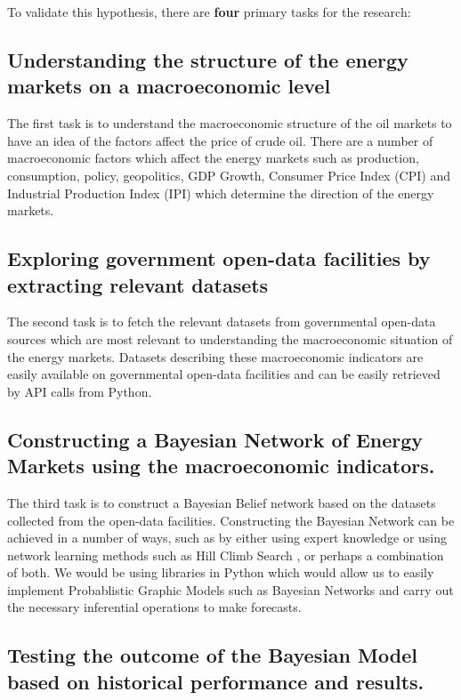 To validate this hypothesis, there are \textbf{four} primary tasks for the research:

\subsection{Understanding the structure of the energy markets on a macroeconomic level}

The first task is to understand the macroeconomic structure of the oil markets to have an idea of the factors affect the price of crude oil. There are a number of macroeconomic factors \cite{Lee2017} which affect the energy markets such as production, consumption, policy, geopolitics, GDP Growth, Consumer Price Index (CPI) and Industrial Production Index (IPI) which determine the direction of the energy markets.

\subsection{Exploring government open-data facilities by extracting relevant datasets}

The second task is to fetch the relevant datasets from governmental open-data sources which are most relevant to understanding the macroeconomic situation of the energy markets. Datasets describing these macroeconomic indicators are easily available on governmental open-data facilities and can be easily retrieved by API calls from Python.

\subsection{Constructing a Bayesian Network of Energy Markets using the macroeconomic indicators.}

The third task is to construct a Bayesian Belief network based on the datasets collected from the open-data facilities. Constructing the Bayesian Network can be achieved in a number of ways, such as by either using expert knowledge or using network learning methods such as Hill Climb Search \cite{neapolitan2004learning}, or perhaps a combination of both. We would be using libraries in Python which would allow us to easily implement Probablistic Graphic Models such as Bayesian Networks and carry out the necessary inferential operations to make forecasts.

\subsection{Testing the outcome of the Bayesian Model based on historical performance and results.}

